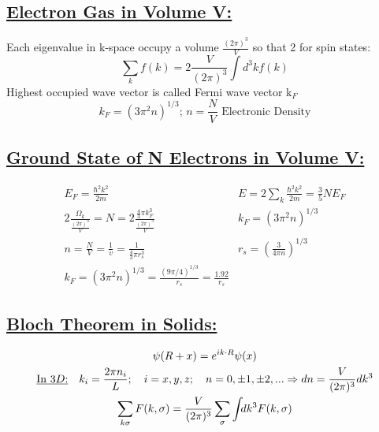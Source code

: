 \documentclass[a4paper,12pt]{article}
\begin{document}
\subsection*{\underline{Electron Gas in Volume V:}}
Each eigenvalue in k-space occupy a volume $\frac{{(2\pi)^3}}{V}$ so that 2 for spin states:
\begin{equation} \sum_k f(k)=2\frac{V}{(2\pi)^3}\int d^3k f(k) \end{equation}
Highest occupied wave vector is called Fermi wave vector k$_F$
\begin{equation} k_F = (3\pi^2n)^{1/3}; \, n=\frac{N}{V} \,\, \text{Electronic Density}\end{equation}

\subsection*{\underline{Ground State of N Electrons in Volume V:}}

\begin{align}
     & E_F=\frac{\hbar^2k^2}{2m}
     & E=2\sum_k\frac{\hbar^2k^2}{2m}=\frac{3}{5}NE_F
     &                                                                                         \\
     & 2\frac{\Omega_k}{\frac{(2\pi)^3}{V}}=N=2\frac{\frac{4}{3}\pi k_F^3}{\frac{(2\pi)^3}{V}}
     & k_F = (3\pi^2n)^{1/3}
     &                                                                                         \\
     & n=\frac{N}{V}=\frac{1}{v}=\frac{1}{\frac{4}{3}\pi r_s^3}
     & r_s=\left(\frac{3}{4\pi n}\right)^{1/3}
     &                                                                                         \\
     & k_F = (3\pi^2n)^{1/3} = \frac{(9\pi /4)^{1/3}}{r_s}=\frac{1.92}{r_s}
\end{align}

\subsection*{\underline{Bloch Theorem in Solids:}}
\begin{gather}
    \psi (R+x)=e^{i k\cdot R} \psi (x)\\
    \text{\underline{In $3D$:}}\quad k_i = \frac{2\pi n_i}{L}; \quad i=x, y, z;\quad n=0, \pm1, \pm 2, ... \Rightarrow dn = \frac{V}{(2\pi)^3} dk^3\\
    \sum_{k\sigma}F(k, \sigma)= \frac{V}{(2\pi)^3} \sum_\sigma \int_{}  d k^3 F(k, \sigma)
\end{gather}
\end{document}
